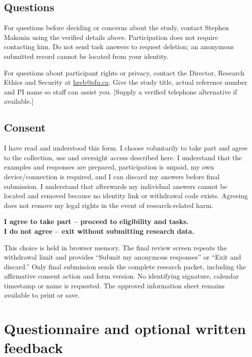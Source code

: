 \documentclass[11pt,letterpaper]{article}
\begin{document}
\subsection*{Questions}
For questions before deciding or concerns about the study, contact Stephen Makonin using the verified details above. Participation does not require contacting him. Do not send task answers to request deletion; an anonymous submitted record cannot be located from your identity.

For questions about participant rights or privacy, contact the Director, Research Ethics and Security at \href{mailto:hreb@sfu.ca}{hreb@sfu.ca}. Give the study title, actual reference number and PI name so staff can assist you. [Supply a verified telephone alternative if available.]

\subsection*{Consent}
I have read and understood this form. I choose voluntarily to take part and agree to the collection, use and oversight access described here. I understand that the examples and responses are prepared, participation is unpaid, my own device/connection is required, and I can discard my answers before final submission. I understand that afterwards my individual answers cannot be located and removed because no identity link or withdrawal code exists. Agreeing does not remove my legal rights in the event of research-related harm.

\textbf{I agree to take part -- proceed to eligibility and tasks.}\\
\textbf{I do not agree -- exit without submitting research data.}

This choice is held in browser memory. The final review screen repeats the withdrawal limit and provides ``Submit my anonymous responses'' or ``Exit and discard.'' Only final submission sends the complete research packet, including the affirmative consent action and form version. No identifying signature, calendar timestamp or name is requested. The approved information sheet remains available to print or save.

\newpage
\section{Questionnaire and optional written feedback}\label{app:survey}
\end{document}
